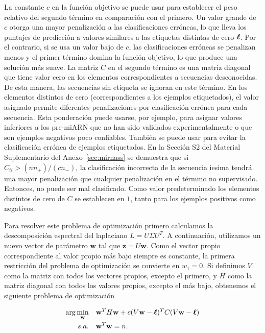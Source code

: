La constante $ c $ en la función objetivo se puede usar para establecer el peso relativo del segundo término en comparación con el primero. Un valor grande de
$c$ otorga una mayor penalización a las clasificaciones erróneas, lo que lleva los puntajes de predicción a valores similares a las etiquetas distintas de cero
$ \boldsymbol\ell $. Por el contrario, si se usa un valor bajo de $ c $, las clasificaciones erróneas se penalizan menos y el primer término domina la función objetivo,
lo que produce una solución más suave. La matriz $C$ en el segundo término es una matriz diagonal que tiene valor cero en los elementos correspondientes a
secuencias desconocidas. De esta manera, las secuencias sin etiqueta se ignoran en este término. En los elementos distintos de cero (correspondientes a los
ejemplos etiquetados), el valor asignado permite diferentes penalizaciones por clasificación errónea para cada secuencia. Esta ponderación puede usarse, por
ejemplo, para asignar valores inferiores a los pre-miARN que no han sido validados experimentalmente o que son ejemplos negativos poco confiables. También se
puede usar para evitar la clasificación errónea de ejemplos etiquetados. En la Sección S2 del Material Suplementario del Anexo~\ref{sec:mirnass} se demuestra
que si $ C_ {ii}> (n n _ {+}) / (c n _ {-}) $, la clasificación incorrecta de la secuencia iesima tendrá una mayor penalización que cualquier penalización en
el término no supervisado. Entonces, no puede ser mal clasificado. Como valor predeterminado los elementos distintos de cero de $ C $ se establecen en $ 1 $,
tanto para los ejemplos positivos como negativos.

Para resolver este problema de optimización primero calculamos la descomposición espectral del laplaciano $ L = U \Sigma U ^ T $. A continuación, utilizamos un
nuevo vector de parámetro $ \mathbf {w} $ tal que $ \mathbf {z} = U \mathbf {w} $. Como el vector propio correspondiente al valor propio más bajo siempre es
constante, la primera restricción del problema de optimización se convierte en $ w_ {1} = 0 $. Si definimos $ V $ como la matriz con todos los vectores propios,
excepto el primero, y $ H $ como la matriz diagonal con todos los valores propios, excepto el más bajo, obtenemos el siguiente problema de optimización

\begin{equation}
	\begin{split}
		\arg\min_{\mathbf{w}} & \quad \mathbf{w}^T H \mathbf{w} + c (V \mathbf{w} - \boldsymbol\ell)^T C (V \mathbf{w} - \boldsymbol\ell) \\
		s.a. & \quad \mathbf{w}^T \mathbf{w} = n.
	\end{split}
\end{equation}

